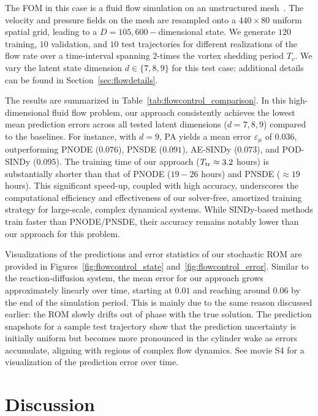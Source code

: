 \documentclass{article}
\begin{document}
	The FOM in this case is a fluid flow simulation on an unstructured mesh~\cite{Rabault_2019_Flow_Control_DRL}. The velocity and pressure fields on the mesh are resampled onto a $440 \times 80$ uniform spatial grid, leading to a $D=105,600-$dimensional state. 
	We generate $120$ training, $10$ validation, and $10$ test trajectories for different realizations of the flow rate over a time-interval spanning $2$-times the vortex shedding period $T_v$. 
	We vary the latent state dimension $d\in \{7, 8, 9\}$ for this test case; additional details can be found in Section~\ref{sec:flowdetails}.
	
	The results are summarized in Table~\ref{tab:flowcontrol_comparison}. In this high-dimensional fluid flow problem, our approach consistently achieves the lowest mean prediction errors across all tested latent dimensions ($d=7,8,9$) compared to the baselines. For instance, with $d=9$, PA yields a mean error $\varepsilon_\mu$ of $0.036$, outperforming PNODE ($0.076$), PNSDE ($0.091$), AE-SINDy ($0.073$), and POD-SINDy ($0.095$). The training time of our approach ($T_{\rm tr} \approx 3.2$ hours) is substantially shorter than that of PNODE ($19-26$ hours) and PNSDE ($\approx19$ hours). This significant speed-up, coupled with high accuracy, underscores the computational efficiency and effectiveness of our solver-free, amortized training strategy for large-scale, complex dynamical systems. While SINDy-based methods train faster than PNODE/PNSDE, their accuracy remains notably lower than our approach for this problem.
	
	Visualizations of the predictions and error statistics of our stochastic ROM are provided in Figures~\ref{fig:flowcontrol_state} and~\ref{fig:flowcontrol_error}. Similar to the reaction-diffusion system, the mean error for our approach  grows approximately linearly over time, starting at $0.01$ and reaching around $0.06$ by the end of the simulation period. This is mainly due to the same reason discussed earlier: the ROM slowly drifts out of phase with the true
	solution. The prediction snapshots for a sample test trajectory show that the prediction uncertainty is initially uniform but becomes more pronounced in the cylinder wake as errors accumulate, aligning with regions of complex flow dynamics. See movie S4 for a visualization of the prediction error over time.
	
	\section{Discussion}
	
\end{document}
